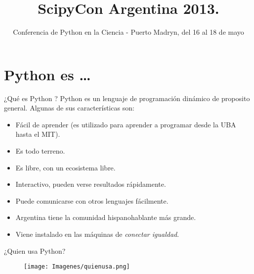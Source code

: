 \documentclass[xcolor=dvipsnames]{beamer}
\begin{document}
\title{ScipyCon Argentina 2013.}
\subtitle{Conferencia de Python en la Ciencia - Puerto Madryn, del 16 al 18 de mayo}
\date{\scalebox{3}{\insertlogo}}

\begin{frame}
\titlepage
\end{frame}

\section{Python es \ldots}

\begin{frame}{¿Qu\'e es Python ?}
	Python es un lenguaje de programación dinámico de proposito general. Algunas de sus características son:
	\begin{itemize}
		\item Fácil de aprender (es utilizado para aprender a programar desde la UBA hasta el MIT).
		\item Es todo terreno. 
		\item Es libre, con un ecosistema libre.
		\item Interactivo, pueden verse resultados rápidamente.
		\item Puede comunicarse con otros lenguajes fácilmente.
		\item Argentina tiene la comunidad hispanohablante más grande.
		\item Viene instalado en las máquinas de \emph{conectar igualdad}.
	\end{itemize}
\end{frame}

\begin{frame}{¿Quien usa Python?}

 \begin{figure}[h]
		\texttt{[image: Imagenes/quienusa.png]}
\end{figure}
%
\end{frame}
\end{document}
